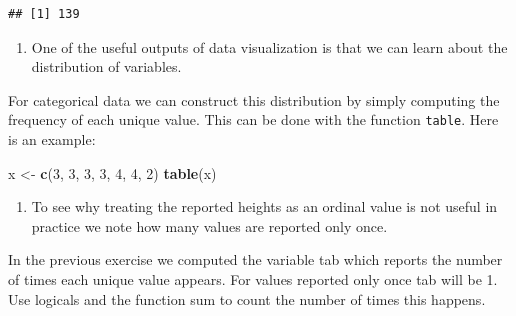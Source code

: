 \documentclass[
]{article}
\newenvironment{Shaded}{\begin{snugshade}}{\end{snugshade}}
\newcommand{\DecValTok}[1]{\textcolor[rgb]{0.00,0.00,0.81}{#1}}
\newcommand{\KeywordTok}[1]{\textcolor[rgb]{0.13,0.29,0.53}{\textbf{#1}}}
\newcommand{\NormalTok}[1]{#1}
\newcommand{\OperatorTok}[1]{\textcolor[rgb]{0.81,0.36,0.00}{\textbf{#1}}}
\newcommand{\StringTok}[1]{\textcolor[rgb]{0.31,0.60,0.02}{#1}}
\providecommand{\tightlist}{%
  \setlength{\itemsep}{0pt}\setlength{\parskip}{0pt}}
\begin{document}
\begin{verbatim}
## [1] 139
\end{verbatim}

\begin{enumerate}
\def\labelenumi{\arabic{enumi}.}
\setcounter{enumi}{3}
\tightlist
\item
  One of the useful outputs of data visualization is that we can learn
  about the distribution of variables.
\end{enumerate}

For categorical data we can construct this distribution by simply
computing the frequency of each unique value. This can be done with the
function \texttt{table}. Here is an example:

\begin{Shaded}
\begin{Highlighting}[]
\NormalTok{x <-}\StringTok{ }\KeywordTok{c}\NormalTok{(}\DecValTok{3}\NormalTok{, }\DecValTok{3}\NormalTok{, }\DecValTok{3}\NormalTok{, }\DecValTok{3}\NormalTok{, }\DecValTok{4}\NormalTok{, }\DecValTok{4}\NormalTok{, }\DecValTok{2}\NormalTok{)}
\KeywordTok{table}\NormalTok{(x)}
\end{Highlighting}
\end{Shaded}

\begin{Shaded}
\end{Shaded}

\begin{enumerate}
\def\labelenumi{\arabic{enumi}.}
\setcounter{enumi}{4}
\tightlist
\item
  To see why treating the reported heights as an ordinal value is not
  useful in practice we note how many values are reported only once.
\end{enumerate}

In the previous exercise we computed the variable tab which reports the
number of times each unique value appears. For values reported only once
tab will be 1. Use logicals and the function sum to count the number of
times this happens.

\begin{Shaded}
\end{Shaded}
\end{document}
